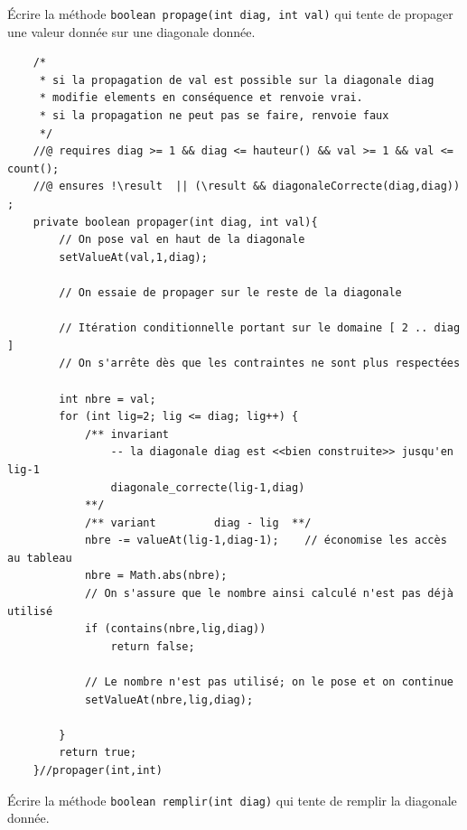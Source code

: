 \documentclass[10pt]{article}\usepackage[correction,nu]{esial}
\begin{document}
\begin{Question}
  Écrire la méthode \texttt{boolean propage(int diag, int val)} qui tente de
  propager une valeur donnée sur une diagonale donnée.
\end{Question}
\begin{Reponse}
\begin{verbatim}
    /*
     * si la propagation de val est possible sur la diagonale diag
     * modifie elements en conséquence et renvoie vrai.
     * si la propagation ne peut pas se faire, renvoie faux
     */ 
    //@ requires diag >= 1 && diag <= hauteur() && val >= 1 && val <= count();
    //@ ensures !\result  || (\result && diagonaleCorrecte(diag,diag)) ;
    private boolean propager(int diag, int val){
        // On pose val en haut de la diagonale
        setValueAt(val,1,diag);

        // On essaie de propager sur le reste de la diagonale

        // Itération conditionnelle portant sur le domaine [ 2 .. diag ]
        // On s'arrête dès que les contraintes ne sont plus respectées

        int nbre = val;
        for (int lig=2; lig <= diag; lig++) {
            /** invariant
                -- la diagonale diag est <<bien construite>> jusqu'en lig-1
                diagonale_correcte(lig-1,diag)
            **/
            /** variant         diag - lig  **/
            nbre -= valueAt(lig-1,diag-1);    // économise les accès au tableau
            nbre = Math.abs(nbre);
            // On s'assure que le nombre ainsi calculé n'est pas déjà utilisé
            if (contains(nbre,lig,diag))
                return false;

            // Le nombre n'est pas utilisé; on le pose et on continue
            setValueAt(nbre,lig,diag);

        }
        return true;
    }//propager(int,int)
\end{verbatim}
\end{Reponse}
\begin{Question}
  Écrire la méthode \texttt{boolean remplir(int diag)} qui tente de remplir la
  diagonale donnée.
\end{Question}
\end{document}
